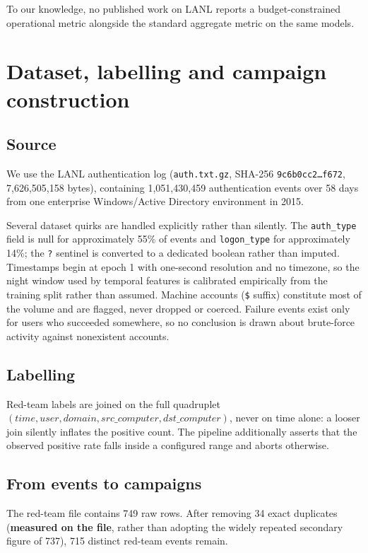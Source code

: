 \documentclass[11pt,a4paper]{article}
\begin{document}
To our knowledge, no published work on LANL reports a budget-constrained
operational metric alongside the standard aggregate metric on the same models.

\section{Dataset, labelling and campaign construction}

\subsection{Source}

We use the LANL authentication log (\texttt{auth.txt.gz}, SHA-256
\texttt{9c6b0cc2\ldots f672}, 7{,}626{,}505{,}158 bytes), containing
1{,}051{,}430{,}459 authentication events over 58 days from one enterprise
Windows/Active Directory environment in 2015.

Several dataset quirks are handled explicitly rather than silently. The
\texttt{auth\_type} field is null for approximately 55\% of events and
\texttt{logon\_type} for approximately 14\%; the \texttt{?} sentinel is converted
to a dedicated boolean rather than imputed. Timestamps begin at epoch 1 with
one-second resolution and no timezone, so the night window used by temporal
features is calibrated empirically from the training split rather than assumed.
Machine accounts (\texttt{\$} suffix) constitute most of the volume and are
flagged, never dropped or coerced. Failure events exist only for users who
succeeded somewhere, so no conclusion is drawn about brute-force activity against
nonexistent accounts.

\subsection{Labelling}

Red-team labels are joined on the full quadruplet
$(\textit{time}, \textit{user}, \textit{domain}, \textit{src\_computer},
\textit{dst\_computer})$, never on time alone: a looser join silently inflates
the positive count. The pipeline additionally asserts that the observed positive
rate falls inside a configured range and aborts otherwise.

\subsection{From events to campaigns}

The red-team file contains 749 raw rows. After removing 34 exact duplicates
(\textbf{measured on the file}, rather than adopting the widely repeated secondary
figure of 737), 715 distinct red-team events remain.
\end{document}
